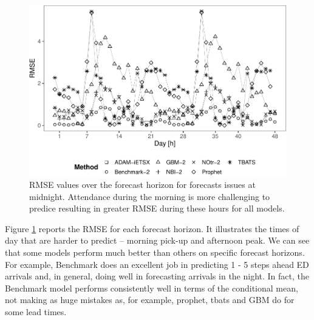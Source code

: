 \documentclass[]{elsarticle} %
\begin{document}
\begin{figure}[H]

{\centering \includegraphics[width=0.7\linewidth]{paper_files/figure-latex/lead-time-rmse-1} 

}

\caption{RMSE values over the forecast horizon for forecasts issues at midnight. Attendance during the morning is more challenging to predice resulting in greater RMSE during these hours for all models.}\label{fig:lead-time-rmse}
\end{figure}

Figure \ref{fig:lead-time-rmse} reports the RMSE for each forecast horizon. It illustrates the times of day that are harder to predict -- morning pick-up and afternoon peak. We can see that some models perform much better than others on specific forecast horizons. For example, Benchmark does an excellent job in predicting 1 - 5 steps ahead ED arrivals and, in general, doing well in forecasting arrivals in the night. In fact, the Benchmark model performs consistently well in terms of the conditional mean, not making as huge mistakes as, for example, prophet, tbats and GBM do for some lead times.
\end{document}
